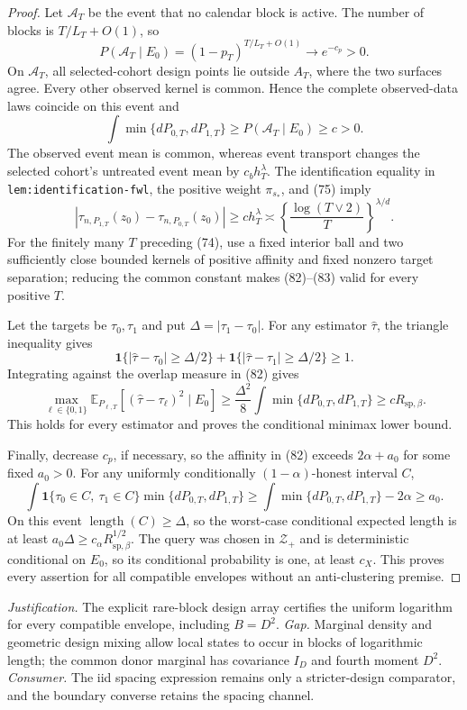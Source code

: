 \documentclass{article}
\begin{document}
\begin{proof}
Let \(\mathcal A_T\) be the event that no calendar block is active.  The number of blocks is \(T/L_T+O(1)\), so
\[
P(\mathcal A_T\mid E_0)
=(1-p_T)^{T/L_T+O(1)}\longrightarrow e^{-c_p}>0.
\tag{81}
\]
On \(\mathcal A_T\), all selected-cohort design points lie outside \(A_T\), where the two surfaces agree.  Every other observed kernel is common.  Hence the complete observed-data laws coincide on this event and
\[
\int\min\{dP_{0,T},dP_{1,T}\}
\geq P(\mathcal A_T\mid E_0)\geq c>0.
\tag{82}
\]
The observed event mean is common, whereas event transport changes the selected cohort's untreated event mean by \(c_bh_T^\lambda\).  The identification equality in \texttt{lem:identification-fwl}, the positive weight \(\pi_{s_*}\), and (75) imply
\[
|\tau_{n,P_{1,T}}(z_0)-\tau_{n,P_{0,T}}(z_0)|
\geq ch_T^\lambda
\asymp\left\{\frac{\log(T\vee2)}T\right\}^{\lambda/d}.
\tag{83}
\]
For the finitely many \(T\) preceding (74), use a fixed interior ball and two sufficiently close bounded kernels of positive affinity and fixed nonzero target separation; reducing the common constant makes (82)--(83) valid for every positive \(T\).

Let the targets be \(\tau_0,\tau_1\) and put \(\Delta=|\tau_1-\tau_0|\).  For any estimator \(\widehat\tau\), the triangle inequality gives
\[
\mathbf1\{|\widehat\tau-\tau_0|\geq\Delta/2\}
+\mathbf1\{|\widehat\tau-\tau_1|\geq\Delta/2\}\geq1.
\]
Integrating against the overlap measure in (82) gives
\[
\max_{\ell\in\{0,1\}}
\mathbb E_{P_{\ell,T}}[(\widehat\tau-\tau_\ell)^2\mid E_0]
\geq\frac{\Delta^2}{8}\int\min\{dP_{0,T},dP_{1,T}\}
\geq cR_{\mathrm{sp},\beta}.
\tag{84}
\]
This holds for every estimator and proves the conditional minimax lower bound.

Finally, decrease \(c_p\), if necessary, so the affinity in (82) exceeds \(2\alpha+a_0\) for some fixed \(a_0>0\).  For any uniformly conditionally \((1-\alpha)\)-honest interval \(C\),
\[
\int\mathbf1\{\tau_0\in C,\ \tau_1\in C\}
\min\{dP_{0,T},dP_{1,T}\}
\geq\int\min\{dP_{0,T},dP_{1,T}\}-2\alpha
\geq a_0.
\]
On this event \(\operatorname{length}(C)\geq\Delta\), so the worst-case conditional expected length is at least
\(a_0\Delta\geq c_\alpha R_{\mathrm{sp},\beta}^{1/2}\).  The query was chosen in \(\mathcal Z_+\) and is deterministic conditional on \(E_0\), so its conditional probability is one, at least \(c_X\).  This proves every assertion for all compatible envelopes without an anti-clustering premise.
\end{proof}
\par\smallskip\noindent \textit{Justification.} The explicit rare-block design array certifies the uniform logarithm for every compatible envelope, including \(B=D^2\). \textit{Gap.} Marginal density and geometric design mixing allow local states to occur in blocks of logarithmic length; the common donor marginal has covariance \(I_D\) and fourth moment \(D^2\). \textit{Consumer.} The iid spacing expression remains only a stricter-design comparator, and the boundary converse retains the spacing channel.
\end{document}
